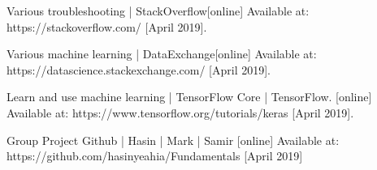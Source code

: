 \documentclass[conference]{IEEEtran}
\begin{document}
\begin{thebibliography}{1}

Various troubleshooting | StackOverflow[online]
Available at: https://stackoverflow.com/ [April 2019].

Various machine learning | DataExchange[online]
Available at: https://datascience.stackexchange.com/ [April 2019].

Learn and use machine learning  |  TensorFlow Core  |  TensorFlow. [online] Available at: https://www.tensorflow.org/tutorials/keras [April 2019].

Group Project Github | Hasin | Mark | Samir [online]
Available at: https://github.com/hasinyeahia/Fundamentals [April 2019]

\end{thebibliography}
\end{document}
